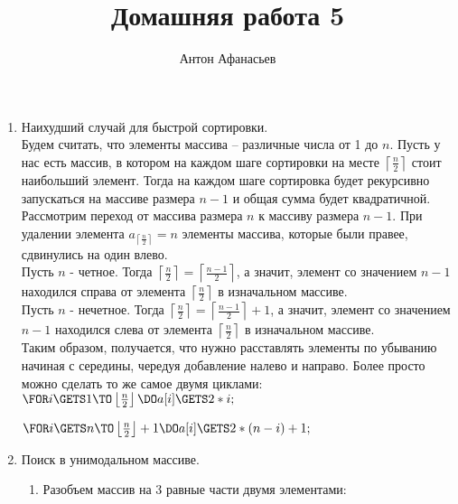 \documentclass[10pt]{article}
\begin{document}
\title{Домашняя работа 5}
\author{Антон Афанасьев}
\maketitle

\begin{enumerate}
	\item Наихудший случай для быстрой сортировки.\\
	Будем считать, что элементы массива -- различные числа от 1 до $n$. Пусть у нас есть массив, в котором на каждом шаге сортировки на месте $\left \lceil \frac{n}{2} \right \rceil$ стоит наибольший элемент. Тогда на каждом шаге сортировка будет рекурсивно запускаться на массиве размера $n-1$ и общая сумма будет квадратичной.\\
	Рассмотрим переход от массива размера $n$ к массиву размера $n-1$. При удалении элемента $a_{\left \lceil \frac{n}{2} \right \rceil}= n$ элементы массива, которые были правее, сдвинулись на один влево.\\
	Пусть $n$ - четное. Тогда $\left \lceil \frac{n}{2} \right \rceil = \left \lceil \frac{n-1}{2} \right \rceil$, а значит, элемент со значением $n-1$ находился справа от элемента $\left \lceil \frac{n}{2} \right \rceil$ в изначальном массиве.\\
	Пусть $n$ - нечетное. Тогда $\left \lceil \frac{n}{2} \right \rceil = \left \lceil \frac{n-1}{2} \right \rceil + 1$, а значит, элемент со значением $n-1$ находился слева от элемента $\left \lceil \frac{n}{2} \right \rceil$ в изначальном массиве.\\
	Таким образом, получается, что нужно расставлять элементы по убыванию начиная с середины, чередуя добавление налево и направо. Более просто можно сделать то же самое двумя циклами:\\
	$\FOR i \GETS 1 \TO \left \lfloor \frac{n}{2} \right \rfloor \DO
		a[i] \GETS 2*i;
	$
	
	$\FOR i \GETS n \TO \left \lfloor \frac{n}{2} \right \rfloor+1 \DO
		a[i] \GETS 2*(n-i)+1;
	$
	
	\item Поиск в унимодальном массиве.
	\begin{enumerate}
		\item Разобъем массив на 3 равные части двумя элементами:
		
	\end{enumerate}
\end{enumerate}
\end{document}
